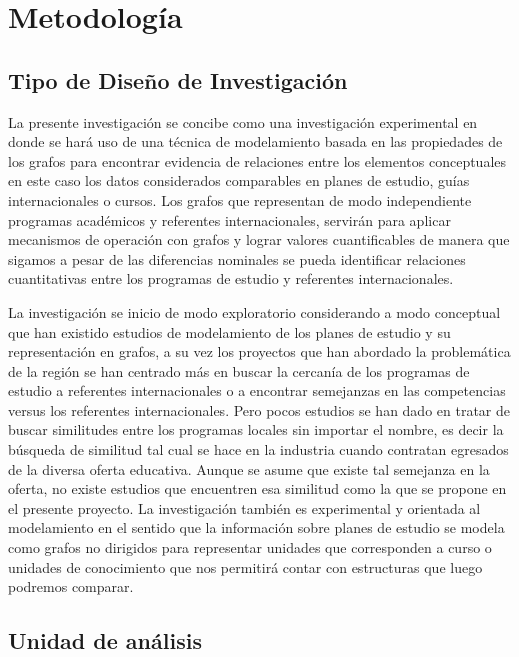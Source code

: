 \chapter{Metodología}

\section{Tipo de Diseño de Investigación}
La presente investigación se concibe como una investigación experimental en donde se hará uso de una técnica de modelamiento basada en las propiedades de los grafos para encontrar evidencia de relaciones entre los elementos conceptuales en este caso los datos considerados comparables en planes de estudio, guías internacionales o cursos. Los grafos que representan de modo independiente programas académicos y referentes internacionales, servirán para aplicar mecanismos de operación con grafos y lograr valores cuantificables de manera que sigamos a pesar de las diferencias nominales se pueda identificar relaciones cuantitativas entre los programas de estudio y referentes internacionales.

La investigación se inicio de modo exploratorio considerando a modo conceptual que han existido estudios de modelamiento de los planes de estudio y su representación en grafos, a su vez los proyectos que han abordado la problemática de la región se han centrado más en buscar la cercanía de los programas de estudio a referentes internacionales o a encontrar semejanzas en las competencias versus los referentes internacionales. Pero pocos estudios se han dado en tratar de buscar similitudes entre los programas locales sin importar el nombre, es decir la búsqueda de similitud tal cual se hace en la industria cuando contratan egresados de la diversa oferta educativa. Aunque se asume que existe tal semejanza en la oferta, no existe estudios que encuentren esa similitud como la que se propone en el presente proyecto. La investigación también es experimental y orientada al modelamiento en el sentido que la información sobre planes de estudio se modela como grafos no dirigidos para representar unidades que corresponden a curso o unidades de conocimiento que nos permitirá contar con estructuras que luego podremos comparar. 


\section{Unidad de análisis}


